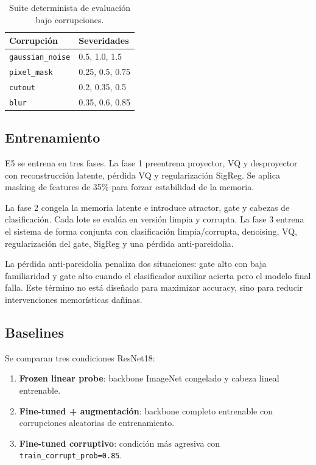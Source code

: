 \documentclass[11pt,a4paper]{article}
\begin{document}
\begin{table}[htbp]
\centering
\begin{tabular}{ll}
\toprule
Corrupción & Severidades \\
\midrule
\texttt{gaussian\_noise} & 0.5, 1.0, 1.5 \\
\texttt{pixel\_mask} & 0.25, 0.5, 0.75 \\
\texttt{cutout} & 0.2, 0.35, 0.5 \\
\texttt{blur} & 0.35, 0.6, 0.85 \\
\bottomrule
\end{tabular}
\caption{Suite determinista de evaluación bajo corrupciones.}
\label{tab:corruptions}
\end{table}

\subsection{Entrenamiento}

E5 se entrena en tres fases. La fase 1 preentrena proyector, VQ y desproyector
con reconstrucción latente, pérdida VQ y regularización SigReg. Se aplica
masking de features de 35\% para forzar estabilidad de la memoria.

La fase 2 congela la memoria latente e introduce atractor, gate y cabezas de
clasificación. Cada lote se evalúa en versión limpia y corrupta. La fase 3
entrena el sistema de forma conjunta con clasificación limpia/corrupta,
denoising, VQ, regularización del gate, SigReg y una pérdida anti-pareidolia.

La pérdida anti-pareidolia penaliza dos situaciones: gate alto con baja
familiaridad y gate alto cuando el clasificador auxiliar acierta pero el modelo
final falla. Este término no está diseñado para maximizar accuracy, sino para
reducir intervenciones memorísticas dañinas.

\subsection{Baselines}

Se comparan tres condiciones ResNet18:
\begin{enumerate}
    \item \textbf{Frozen linear probe}: backbone ImageNet congelado y cabeza
    lineal entrenable.
    \item \textbf{Fine-tuned + augmentación}: backbone completo entrenable con
    corrupciones aleatorias de entrenamiento.
    \item \textbf{Fine-tuned corruptivo}: condición más agresiva con
    \texttt{train\_corrupt\_prob=0.85}.
\end{enumerate}
\end{document}
